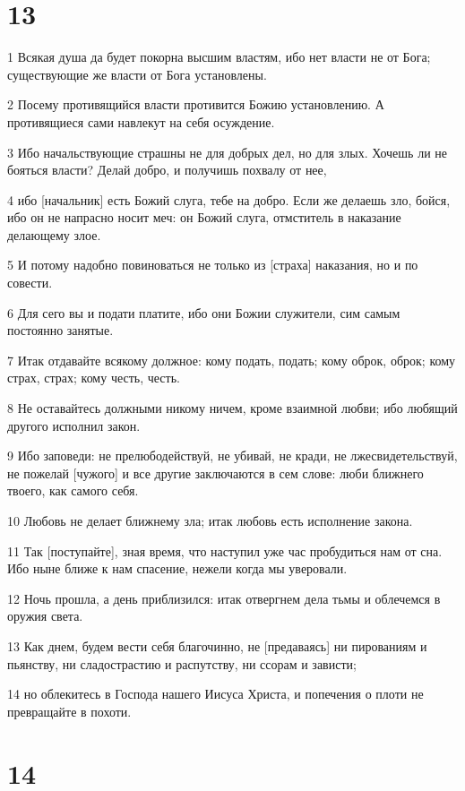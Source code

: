 \chapter{13}

\par 1 Всякая душа да будет покорна высшим властям, ибо нет власти не от Бога; существующие же власти от Бога установлены.
\par 2 Посему противящийся власти противится Божию установлению. А противящиеся сами навлекут на себя осуждение.
\par 3 Ибо начальствующие страшны не для добрых дел, но для злых. Хочешь ли не бояться власти? Делай добро, и получишь похвалу от нее,
\par 4 ибо [начальник] есть Божий слуга, тебе на добро. Если же делаешь зло, бойся, ибо он не напрасно носит меч: он Божий слуга, отмститель в наказание делающему злое.
\par 5 И потому надобно повиноваться не только из [страха] наказания, но и по совести.
\par 6 Для сего вы и подати платите, ибо они Божии служители, сим самым постоянно занятые.
\par 7 Итак отдавайте всякому должное: кому подать, подать; кому оброк, оброк; кому страх, страх; кому честь, честь.
\par 8 Не оставайтесь должными никому ничем, кроме взаимной любви; ибо любящий другого исполнил закон.
\par 9 Ибо заповеди: не прелюбодействуй, не убивай, не кради, не лжесвидетельствуй, не пожелай [чужого] и все другие заключаются в сем слове: люби ближнего твоего, как самого себя.
\par 10 Любовь не делает ближнему зла; итак любовь есть исполнение закона.
\par 11 Так [поступайте], зная время, что наступил уже час пробудиться нам от сна. Ибо ныне ближе к нам спасение, нежели когда мы уверовали.
\par 12 Ночь прошла, а день приблизился: итак отвергнем дела тьмы и облечемся в оружия света.
\par 13 Как днем, будем вести себя благочинно, не [предаваясь] ни пированиям и пьянству, ни сладострастию и распутству, ни ссорам и зависти;
\par 14 но облекитесь в Господа нашего Иисуса Христа, и попечения о плоти не превращайте в похоти.

\chapter{14}

